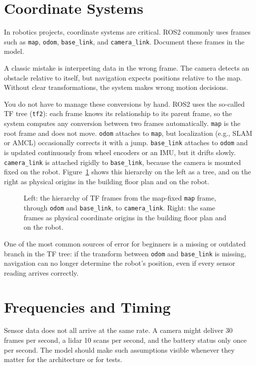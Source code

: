\section{Coordinate Systems}
In robotics projects, coordinate systems are critical. ROS2 commonly uses frames such as \texttt{map}, \texttt{odom}, \texttt{base\_link}, and \texttt{camera\_link}. Document these frames in the model.

A classic mistake is interpreting data in the wrong frame. The camera detects an obstacle relative to itself, but navigation expects positions relative to the map. Without clear transformations, the system makes wrong motion decisions.

You do not have to manage these conversions by hand. ROS2 uses the so-called TF tree (\texttt{tf2}): each frame knows its relationship to its parent frame, so the system computes any conversion between two frames automatically. \texttt{map} is the root frame and does not move. \texttt{odom} attaches to \texttt{map}, but localization (e.g., SLAM or AMCL) occasionally corrects it with a jump. \texttt{base\_link} attaches to \texttt{odom} and is updated continuously from wheel encoders or an IMU, but it drifts slowly. \texttt{camera\_link} is attached rigidly to \texttt{base\_link}, because the camera is mounted fixed on the robot. Figure~\ref{fig:kap10-tf-baum} shows this hierarchy on the left as a tree, and on the right as physical origins in the building floor plan and on the robot.

\begin{figure}[H]
  \centering
  \caption{Left: the hierarchy of TF frames from the map-fixed \texttt{map} frame, through \texttt{odom} and \texttt{base\_link}, to \texttt{camera\_link}. Right: the same frames as physical coordinate origins in the building floor plan and on the robot.}
  \label{fig:kap10-tf-baum}
\end{figure}

\begin{hinweisbox}
One of the most common sources of error for beginners is a missing or outdated branch in the TF tree: if the transform between \texttt{odom} and \texttt{base\_link} is missing, navigation can no longer determine the robot's position, even if every sensor reading arrives correctly.
\end{hinweisbox}

\section{Frequencies and Timing}
Sensor data does not all arrive at the same rate. A camera might deliver 30 frames per second, a lidar 10 scans per second, and the battery status only once per second. The model should make such assumptions visible whenever they matter for the architecture or for tests.

